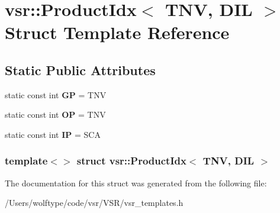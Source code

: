 \hypertarget{structvsr_1_1_product_idx_3_01_t_n_v_00_01_d_i_l_01_4}{\section{vsr\-:\-:Product\-Idx$<$ T\-N\-V, D\-I\-L $>$ Struct Template Reference}
\label{structvsr_1_1_product_idx_3_01_t_n_v_00_01_d_i_l_01_4}
}
\subsection*{Static Public Attributes}
\begin{DoxyCompactItemize}
\item 
\hypertarget{structvsr_1_1_product_idx_3_01_t_n_v_00_01_d_i_l_01_4_a4395f4fa34d31419ae002e81625066cb}{static const int {\bfseries G\-P} = T\-N\-V}\label{structvsr_1_1_product_idx_3_01_t_n_v_00_01_d_i_l_01_4_a4395f4fa34d31419ae002e81625066cb}

\item 
\hypertarget{structvsr_1_1_product_idx_3_01_t_n_v_00_01_d_i_l_01_4_aa945c38ba43b7a6affb539d2bb6b9878}{static const int {\bfseries O\-P} = T\-N\-V}\label{structvsr_1_1_product_idx_3_01_t_n_v_00_01_d_i_l_01_4_aa945c38ba43b7a6affb539d2bb6b9878}

\item 
\hypertarget{structvsr_1_1_product_idx_3_01_t_n_v_00_01_d_i_l_01_4_ad7b3d2f696993060973b818b659cb5af}{static const int {\bfseries I\-P} = S\-C\-A}\label{structvsr_1_1_product_idx_3_01_t_n_v_00_01_d_i_l_01_4_ad7b3d2f696993060973b818b659cb5af}

\end{DoxyCompactItemize}
\subsubsection*{template$<$$>$ struct vsr\-::\-Product\-Idx$<$ T\-N\-V, D\-I\-L $>$}



The documentation for this struct was generated from the following file\-:\begin{DoxyCompactItemize}
\item 
/\-Users/wolftype/code/vsr/\-V\-S\-R/vsr\-\_\-templates.\-h\end{DoxyCompactItemize}
